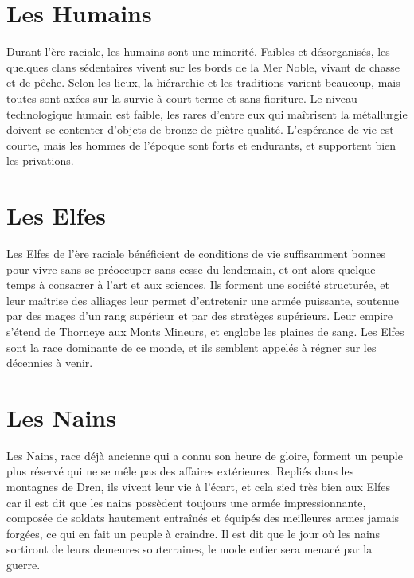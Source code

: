 \section{Les Humains}
Durant l'ère raciale, les humains sont une minorité. Faibles et désorganisés, les quelques clans sédentaires vivent sur les bords de la Mer Noble, vivant de chasse et de pêche. Selon les lieux, la hiérarchie et les traditions varient beaucoup, mais toutes sont axées sur la survie à court terme et sans fioriture. Le niveau technologique humain est faible, les rares d'entre eux qui maîtrisent la métallurgie doivent se contenter d'objets de bronze de piètre qualité. L'espérance de vie est courte, mais les hommes de l'époque sont forts et endurants, et supportent bien les privations.

\section{Les Elfes}
Les Elfes de l'ère raciale bénéficient de conditions de vie suffisamment bonnes pour vivre sans se préoccuper sans cesse du lendemain, et ont alors quelque temps à consacrer à l'art et aux sciences. Ils forment une société structurée, et leur maîtrise des alliages leur permet d'entretenir une armée puissante, soutenue par des mages d'un rang supérieur et par des stratèges supérieurs. Leur empire s'étend de Thorneye aux Monts Mineurs, et englobe les plaines de sang. Les Elfes sont la race dominante de ce monde, et ils semblent appelés à régner sur les décennies à venir.

\section{Les Nains}
Les Nains, race déjà ancienne qui a connu son heure de gloire, forment un peuple plus réservé qui ne se mêle pas des affaires extérieures. Repliés dans les montagnes de Dren, ils vivent leur vie à l'écart, et cela sied très bien aux Elfes car il est dit que les nains possèdent toujours une armée impressionnante, composée de soldats hautement entraînés et équipés des meilleures armes jamais forgées, ce qui en fait un peuple à craindre. Il est dit que le jour où les nains sortiront de leurs demeures souterraines, le mode entier sera menacé par la guerre.

